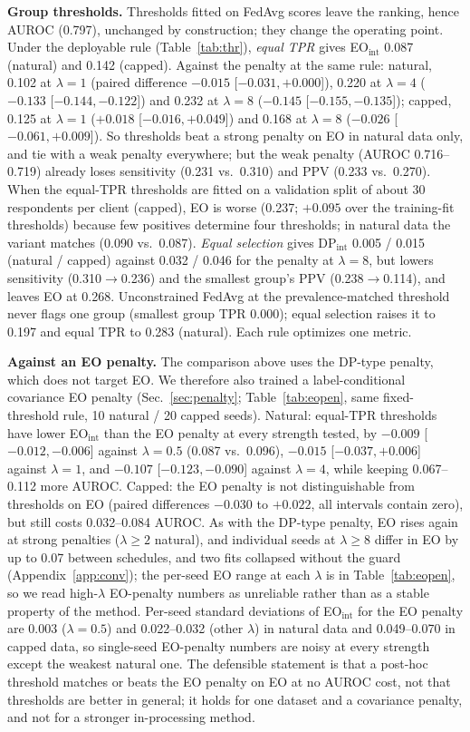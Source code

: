 \textbf{Group thresholds.} Thresholds fitted on FedAvg scores leave the ranking, hence AUROC (0.797), unchanged by construction; they change the operating point. Under the deployable rule (Table~\ref{tab:thr}), \emph{equal TPR} gives EO$_\text{int}$ 0.087 (natural) and 0.142 (capped). Against the penalty at the same rule: natural, 0.102 at $\lambda{=}1$ (paired difference $-0.015$ [$-0.031,+0.000$]), 0.220 at $\lambda{=}4$ ($-0.133$ [$-0.144,-0.122$]) and 0.232 at $\lambda{=}8$ ($-0.145$ [$-0.155,-0.135$]); capped, 0.125 at $\lambda{=}1$ ($+0.018$ [$-0.016,+0.049$]) and 0.168 at $\lambda{=}8$ ($-0.026$ [$-0.061,+0.009$]). So thresholds beat a strong penalty on EO in natural data only, and tie with a weak penalty everywhere; but the weak penalty (AUROC 0.716--0.719) already loses sensitivity (0.231 vs.\ 0.310) and PPV (0.233 vs.\ 0.270). When the equal-TPR thresholds are fitted on a validation split of about 30 respondents per client (capped), EO is worse (0.237; $+0.095$ over the training-fit thresholds) because few positives determine four thresholds; in natural data the variant matches (0.090 vs.\ 0.087). \emph{Equal selection} gives DP$_\text{int}$ 0.005 / 0.015 (natural / capped) against 0.032 / 0.046 for the penalty at $\lambda{=}8$, but lowers sensitivity (0.310$\to$0.236) and the smallest group's PPV (0.238$\to$0.114), and leaves EO at 0.268. Unconstrained FedAvg at the prevalence-matched threshold never flags one group (smallest group TPR 0.000); equal selection raises it to 0.197 and equal TPR to 0.283 (natural). Each rule optimizes one metric. 

\textbf{Against an EO penalty.} The comparison above uses the DP-type penalty, which does not target EO. We therefore also trained a label-conditional covariance EO penalty (Sec.~\ref{sec:penalty}; Table~\ref{tab:eopen}, same fixed-threshold rule, 10 natural / 20 capped seeds). Natural: equal-TPR thresholds have lower EO$_\text{int}$ than the EO penalty at every strength tested, by $-0.009$ [$-0.012,-0.006$] against $\lambda{=}0.5$ (0.087 vs.\ 0.096), $-0.015$ [$-0.037,+0.006$] against $\lambda{=}1$, and $-0.107$ [$-0.123,-0.090$] against $\lambda{=}4$, while keeping 0.067--0.112 more AUROC. Capped: the EO penalty is not distinguishable from thresholds on EO (paired differences $-0.030$ to $+0.022$, all intervals contain zero), but still costs 0.032--0.084 AUROC. As with the DP-type penalty, EO rises again at strong penalties ($\lambda\ge 2$ natural), and individual seeds at $\lambda\ge 8$ differ in EO by up to 0.07 between schedules, and two fits collapsed without the guard (Appendix~\ref{app:conv}); the per-seed EO range at each $\lambda$ is in Table~\ref{tab:eopen}, so we read high-$\lambda$ EO-penalty numbers as unreliable rather than as a stable property of the method. Per-seed standard deviations of EO$_\text{int}$ for the EO penalty are 0.003 ($\lambda{=}0.5$) and 0.022--0.032 (other $\lambda$) in natural data and 0.049--0.070 in capped data, so single-seed EO-penalty numbers are noisy at every strength except the weakest natural one. The defensible statement is that a post-hoc threshold matches or beats the EO penalty on EO at no AUROC cost, not that thresholds are better in general; it holds for one dataset and a covariance penalty, and not for a stronger in-processing method.

